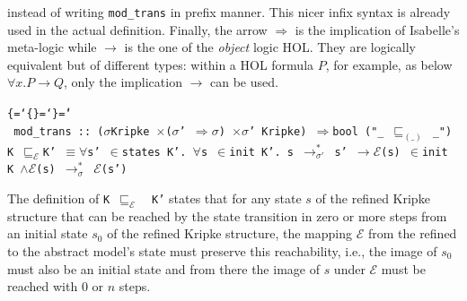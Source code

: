 \documentclass{llncs}
\newenvironment{ttbox}{\begin{alltt}\ttbraces\small\tt}%
                      {\end{alltt}}
\def\ttbraces{\let\.=\nobreak\chardef\{=`\{\chardef\}=`\}\chardef\|=`\\}
\newcommand\ttand{\mbox{{$\land$}}}
\newcommand\ttfun{\mbox{{$\Rightarrow$}}}
\newcommand\ttimp{\mbox{{$\longrightarrow$}}}
\newcommand\ttequiv{\mbox{{$\equiv$}}}
\newcommand\ttforall{\mbox{{$\forall$}}}
\newcommand\ttin{\mbox{{$\in$}}}
\newcommand\ttImp{\mbox{{$\Longrightarrow$}}}
\newcommand\tttimes{\mbox{\( \times \)}}
\newcommand\ttrelstar[1]{\mbox{{$\to_{#1}^*$}}}
\newcommand\ttsigma{\mbox{{$\sigma$}}}
\newcommand\ttmref[1]{\mbox{{$\sqsubseteq_{#1}$}}}
\newcommand\ttmeref{\ttmref{\mathcal{E}}}
\newcommand\ttecal{\mbox{$\mathcal{E}$}}
\begin{document}
instead of writing \texttt{mod\_trans} in prefix manner. This nicer infix
syntax is already used in the actual definition.
Finally, the arrow \texttt{\ttImp} is the implication of Isabelle's  meta-logic
while $\ttimp$ is the one of the {\it object} logic HOL. 
They are logically equivalent but of different
types: within a HOL formula $P$, for example, as below $\forall x. P \ttimp Q$, only the implication $\ttimp$
can be used.
\begin{ttbox}
 mod_trans ::  (\ttsigma Kripke \tttimes (\ttsigma' \ttfun \ttsigma) \tttimes \ttsigma' Kripke) 
               \ttfun bool                  ("_ \ttmref{(\_)} _")
  K \ttmeref K' \ttequiv \ttforall s' \ttin states K'. \ttforall s \ttin init K'. 
             s \ttrelstar{\sigma'} s' \ttimp \ttecal(s) \ttin init K 
             \ttand \ttecal(s) \ttrelstar{\sigma} \ttecal(s')
\end{ttbox}
The definition of \texttt{K \ttmeref\, K'} states that for any state $s$ 
of the refined Kripke structure that can be reached by the state transition
in zero or more steps from an initial state $s_0$ of the refined Kripke 
structure, the mapping ${\mathcal E}$ from the refined to the abstract 
model's state must preserve this reachability, i.e., the image of
$s_0$ must also be an initial state and from there the image of $s$
under ${\mathcal E}$ must be reached with $0$ or $n$ steps.
\end{document}
